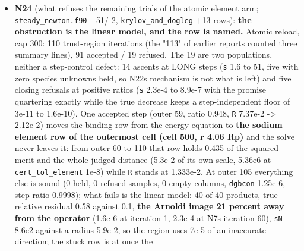 \documentclass[english,a4paper]{my_memo}
\begin{document}
\begin{itemize}
  warning-free, the two suites 136/0 and 182/0 on \texttt{build\_lwv} (the object
  md5 differs from the worker\textquotesingle s delivered one by a post-measurement comment
  edit that moved line numbers, which the I/O statements carry; the
  worker\textquotesingle s line-for-line reproduction of the solve covers it). Not
  converged; the rule is not claimed to improve either fixture. Reported:
  \texttt{cauchy\_leg\_min\_fraction} is now a proxy for a test the code can make
  directly (letting the image test alone decide is the next increment, not
  taken because no fixture exercises the difference); the trial diagnostic\textquotesingle s
  evaluations enter the cost counters.
\item
  \textbf{N24} (what refuses the remaining trials of the atomic element arm;
  \texttt{steady\_newton.f90} +51/-2, \texttt{krylov\_and\_dogleg} +13 rows): \textbf{the
  obstruction is the linear model, and the row is named.} Atomic reload,
  cap 300: 110 trust-region iterations (the "113" of earlier reports counted
  three summary lines), 91 accepted / 19 refused. The 19 are two
  populations, neither a step-control defect: 14 ascents at LONG steps
  (\texttt{\textbar{}\textbar{}s\textbar{}\textbar{}} 1.6 to 51, five with zero species unknowns held, so N22\textquotesingle s
  mechanism is not what is left) and five closing refusals at positive
  ratios (\texttt{\textbar{}\textbar{}s\textbar{}\textbar{}} 2.3e-4 to 8.9e-7 with the promise quartering exactly while
  the true decrease keeps a step-independent floor of 3e-11 to 1.6e-10). One
  accepted step (outer 59, ratio 0.948, \texttt{\textbar{}\textbar{}R\textbar{}\textbar{}} 7.37e-2 -\textgreater{} 2.12e-2) moves the
  binding row from the energy equation to \textbf{the sodium element row of the
  outermost cell (cell 500, r 4.06 Rp)} and the solve never leaves it:
  from outer 60 to 110 that row holds 0.435 of the squared merit and the
  whole judged distance (5.3e-2 of its own scale, 5.36e6 at
  \texttt{cert\_tol\_element} 1e-8) while \texttt{\textbar{}\textbar{}R\textbar{}\textbar{}} stands at 1.333e-2. At outer 105
  everything else is sound (0 held, 0 refused samples, 0 empty columns,
  \texttt{dgbcon} 1.25e-6, step ratio 0.9998); what fails is the linear model: 40
  of 40 products, true relative residual 0.58 against 0.1, \textbf{the Arnoldi
  image 21 percent away from the operator} (1.6e-6 at iteration 1, 2.3e-4 at
  N7\textquotesingle s iteration 60), \texttt{\textbar{}\textbar{}sN\textbar{}\textbar{}} 8.6e2 against a radius 5.9e-2, so the region
  uses 7e-5 of an inaccurate direction; the stuck row is at once the

\end{itemize}
\end{document}
